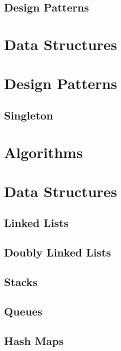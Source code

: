 \documentclass[10pt,a4paper,titlepage]{book}
\begin{document}
\section{Design Patterns}

\vfill
\pagebreak
\chapter{Data Structures}

\vfill
\pagebreak
\chapter{Design Patterns}

\vfill
\pagebreak
\section{Singleton}

\vfill
\pagebreak
\chapter{Algorithms}

\vfill
\pagebreak
\chapter{Data Structures}

\vfill
\pagebreak
\section{Linked Lists}

\vfill
\pagebreak
\section{Doubly Linked Lists}

\vfill
\pagebreak
\section{Stacks}

\vfill
\pagebreak
\section{Queues}

\vfill
\pagebreak
\section{Hash Maps}

\vfill
\pagebreak
\end{document}
